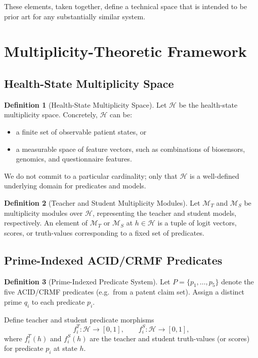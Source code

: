 \documentclass[11pt]{article}
\theoremstyle{definition}
\newtheorem{defn}{Definition}[section]
\theoremstyle{plain}
\theoremstyle{remark}
\begin{document}
These elements, taken together, define a technical space that is intended to be prior art for any substantially similar system.

\section{Multiplicity-Theoretic Framework}

\subsection{Health-State Multiplicity Space}

\begin{defn}[Health-State Multiplicity Space]
Let \(\mathcal{H}\) be the health-state multiplicity space. Concretely, \(\mathcal{H}\) can be:
\begin{itemize}[leftmargin=2em]
  \item a finite set of observable patient states, or
  \item a measurable space of feature vectors, such as combinations of biosensors, genomics, and questionnaire features.
\end{itemize}
We do not commit to a particular cardinality; only that \(\mathcal{H}\) is a well-defined underlying domain for predicates and models.
\end{defn}

\begin{defn}[Teacher and Student Multiplicity Modules]
Let \(\mathcal{M}_T\) and \(\mathcal{M}_S\) be multiplicity modules over \(\mathcal{H}\), representing the teacher and student models, respectively. An element of \(\mathcal{M}_T\) or \(\mathcal{M}_S\) at \(h\in\mathcal{H}\) is a tuple of logit vectors, scores, or truth-values corresponding to a fixed set of predicates.
\end{defn}

\subsection{Prime-Indexed ACID/CRMF Predicates}

\begin{defn}[Prime-Indexed Predicate System]
Let \(P=\{p_1,\dots,p_5\}\) denote the five ACID/CRMF predicates (e.g.\ from a patent claim set). Assign a distinct prime \(q_i\) to each predicate \(p_i\).

Define teacher and student predicate morphisms
\[
  f_i^T : \mathcal{H} \to [0,1],
  \qquad
  f_i^S : \mathcal{H} \to [0,1],
\]
where \(f_i^T(h)\) and \(f_i^S(h)\) are the teacher and student truth-values (or scores) for predicate \(p_i\) at state \(h\).
\end{defn}
\end{document}
